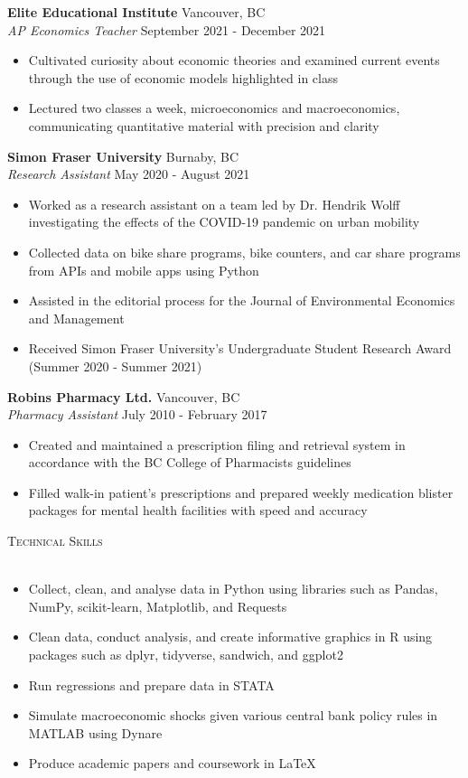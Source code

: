 \documentclass[]{article}
\newcommand{\lineunder} {
    \vspace*{-8pt} \\
    \hspace*{-18pt} \hrulefill \\
}
\newcommand{\header} [1] {
    {\hspace*{-18pt}\vspace*{6pt} \textsc{#1}}
    \vspace*{-6pt} \lineunder
}
\begin{document}
\textbf{Elite Educational Institute} \hfill Vancouver, BC\\
\textit{AP Economics Teacher} \hfill September 2021 - December 2021\\
\begin{itemize}
    \item Cultivated curiosity about economic theories and examined current events through the use of economic models highlighted in class
    \item Lectured two classes a week, microeconomics and macroeconomics, communicating quantitative material with precision and clarity
\end{itemize}

\textbf{Simon Fraser University} \hfill Burnaby, BC\\
\textit{Research Assistant} \hfill May 2020 - August 2021\\
\begin{itemize}
    \item Worked as a research assistant on a team led by Dr. Hendrik Wolff investigating the effects of the COVID-19 pandemic on urban mobility
    \item Collected data on bike share programs, bike counters, and car share programs from APIs and mobile apps using Python
    \item Assisted in the editorial process for the Journal of Environmental Economics and Management
    \item Received Simon Fraser University's Undergraduate Student Research Award (Summer 2020 - Summer 2021) 
\end{itemize}

\textbf{Robin\textquotesingle{}s Pharmacy Ltd.} \hfill Vancouver, BC\\
\textit{Pharmacy Assistant} \hfill July 2010 - February 2017\\
\begin{itemize}
    \item Created and maintained a prescription filing and retrieval system in accordance with the BC College of Pharmacists guidelines
    \item Filled walk-in patient’s prescriptions and prepared weekly medication blister packages for mental health facilities with speed and accuracy
\end{itemize}

\header{Technical Skills}
\begin{itemize}
    \item Collect, clean, and analyse data in Python using libraries such as Pandas, NumPy, scikit-learn, Matplotlib, and Requests
    \item Clean data, conduct analysis, and create informative graphics in R using packages such as dplyr, tidyverse, sandwich, and ggplot2
    \item Run regressions and prepare data in STATA
    \item Simulate macroeconomic shocks given various central bank policy rules in MATLAB using Dynare
    \item Produce academic papers and coursework in \LaTeX
\end{itemize}
\end{document}
